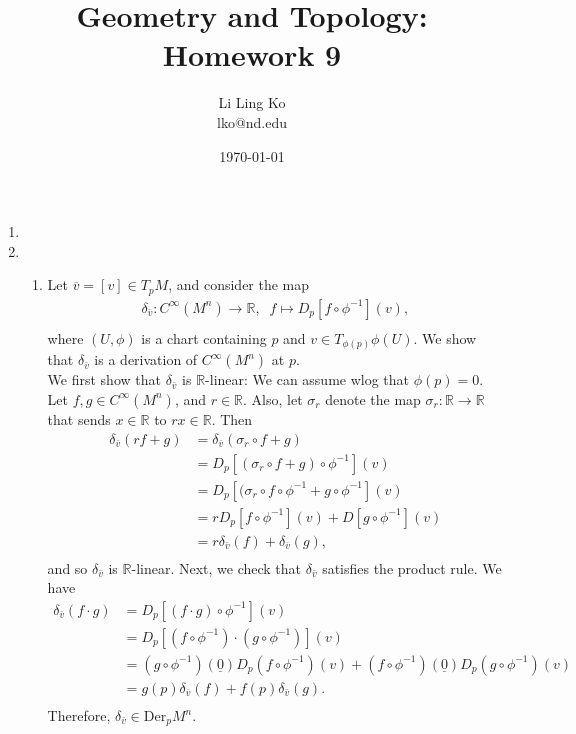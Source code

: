 \documentclass{article}
\begin{document}
\title{Geometry and Topology: Homework 9}
\author{Li Ling Ko\\ lko@nd.edu}
\date{\today}
\maketitle

\begin{enumerate}[label={\bf Q\arabic*:}]
  \item
  \item
    \begin{enumerate}
      \item Let $\overline{v}=[v]\in T_pM$, and consider the map
        \begin{align*}
          \delta_{\bar{v}}:C^\infty(M^n)\rightarrow\mathbb{R},\;\; f\mapsto
          D_p[f\circ\phi^{-1}](v), \\
        \end{align*}
        where $(U,\phi)$ is a chart containing $p$ and $v\in
        T_{\phi(p)}\phi(U)$. We show that $\delta_{\bar{v}}$ is a
        derivation of $C^\infty(M^n)$ at $p$. \\

        We first show that $\delta_{\bar{v}}$ is $\mathbb{R}$-linear: We
        can assume wlog that $\phi(p)=0$. Let $f,g\in C^\infty(M^n)$, and
        $r\in\mathbb{R}$. Also, let $\sigma_r$ denote the map
        $\sigma_r:\mathbb{R}\rightarrow\mathbb{R}$ that sends
        $x\in\mathbb{R}$ to $rx\in\mathbb{R}$. Then
        \begin{align*}
          \delta_{\bar{v}}(rf+g)  &=\delta_{\bar{v}}(\sigma_r\circ f+g) \\
            &=D_p[(\sigma_r\circ f+g)\circ\phi^{-1}](v) \\
            &=D_p[(\sigma_r\circ f\circ\phi^{-1} +g\circ\phi^{-1}](v) \\
            &=rD_p[f\circ\phi^{-1}](v) +D[g\circ\phi^{-1}](v) \\
            &=r\delta_{\bar{v}}(f) +\delta_{\bar{v}}(g), \\
        \end{align*}
        and so $\delta_{\bar{v}}$ is $\mathbb{R}$-linear. Next, we check
        that $\delta_{\bar{v}}$ satisfies the product rule. We have
        \begin{align*}
          \delta_{\bar{v}}(f\cdot g) &=D_p[(f\cdot g)\circ\phi^{-1}](v) \\
            &=D_p[(f\circ\phi^{-1})\cdot(g\circ\phi^{-1})](v) \\
            &=(g\circ\phi^{-1})(\underline{0})D_p(f\circ\phi^{-1})(v)+
              (f\circ\phi^{-1})(\underline{0})D_p(g\circ\phi^{-1})(v) \\
            &=g(p)\delta_{\bar{v}}(f) +f(p)\delta_{\bar{v}}(g). \\
        \end{align*}
        Therefore, $\delta_{\bar{v}}\in\text{Der}_pM^n$.


\end{enumerate}
\end{enumerate}
\end{document}
